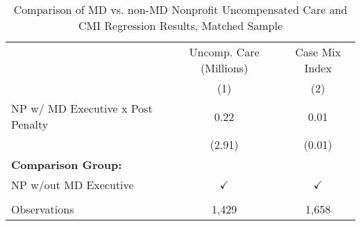 \begin{table}[htbp]
   \caption{\label{tab:MD_noMD_uncomp_CMI_matchsample} Comparison of MD vs. non-MD Nonprofit Uncompensated Care and CMI Regression Results, Matched Sample}
   \bigskip
   \centering
   \begin{tabular}{lcc}
      \toprule
                                        & Uncomp. Care (Millions) & Case Mix Index\\  
                                        & (1)                     & (2)\\  
      \midrule 
      NP w/ MD Executive x Post Penalty & 0.22                    & 0.01\\   
                                        & (2.91)                  & (0.01)\\   
      \textbf{Comparison Group:}        &                         & \\  
      NP w/out MD Executive             & $\checkmark$            & $\checkmark$\\   
       \\
      Observations                      & 1,429                   & 1,658\\  
      \bottomrule
   \end{tabular}
\end{table}
